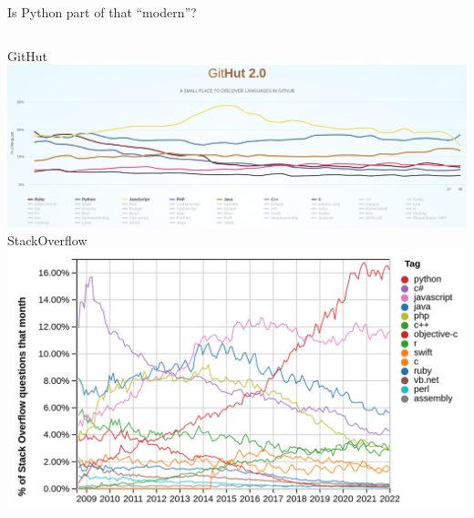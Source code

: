 \documentclass[aspectratio=169]{beamer}
\begin{document}
\begin{frame}{Is Python part of that ``modern''?}
\vspace{0.25 cm}
\begin{columns}[t]
\centering GitHut
\vspace{0.1 cm}
\includegraphics[width=\linewidth]{PLOTS/python-rankings-githut-2022.png}
\centering StackOverflow
\vspace{0.1 cm}
\includegraphics[width=\linewidth]{PLOTS/python-rankings-stackoverflow-2022.png}
\end{columns}
\end{frame}
\end{document}
